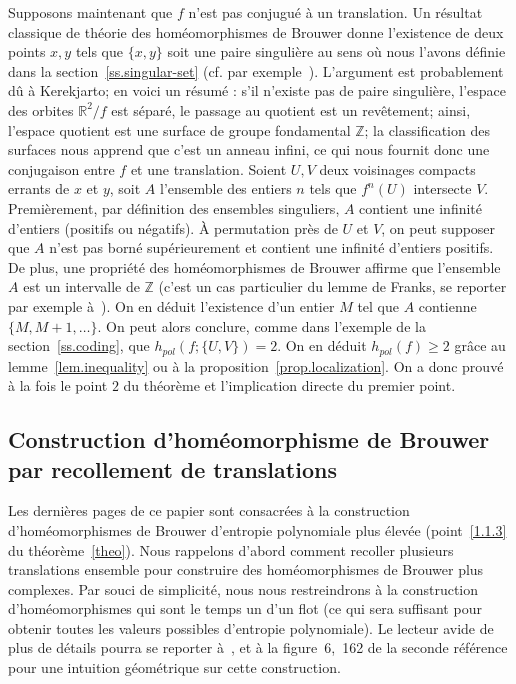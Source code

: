\documentclass[11pt]{article}
\theoremstyle{definition}
\numberwithin{equation}{section}
\numberwithin{figure}{section}
\numberwithin{table}{section}
\newcommand{\bbR}{{\mathbb{R}}}
\newcommand{\bbZ}{{\mathbb{Z}}}
\begin{document}
Supposons maintenant que $f$ n'est pas conjugué à un translation. Un résultat classique de théorie des homéomorphismes de Brouwer donne l'existence de deux points $x,y$ tels que $\{x,y\}$ soit une paire singulière au sens où nous l'avons définie dans la section~\ref{ss.singular-set} (cf. par exemple~\cite{Nak95b}). L'argument est probablement dû à Kerekjarto; en voici un résumé : s'il n'existe pas de paire singulière, l'espace des orbites $\bbR^2/f$ est séparé, le {passage au quotient} est un revêtement; ainsi, l'espace quotient est une surface de groupe fondamental $\bbZ$; la classification des surfaces nous apprend que c'est un anneau infini, ce qui nous fournit donc une conjugaison entre $f$ et une translation. Soient $U,V$ deux voisinages compacts errants de $x$ et $y$, soit $A$ l'ensemble des entiers $n$ tels que $f^n(U)$ intersecte $V$. Premièrement, par définition des ensembles singuliers, $A$ contient une infinité d'entiers (positifs ou négatifs). \`A permutation près de $U$ et $V$, on peut supposer que $A$ n'est pas borné supérieurement et contient une infinité d'entiers positifs. De plus, une propriété des homéomorphismes de Brouwer affirme que l'ensemble $A$ est un intervalle de $\mathbb Z$ (c'est un cas particulier du lemme de Franks, se reporter par exemple à~\cite[Lemma~7]{Ler99}). On en déduit l'existence d'un entier $M$ tel que $A$ contienne $\{M,M+1, \dots \}$. On peut alors conclure, comme dans l'exemple de la section~\ref{ss.coding}, que $h_{pol}(f;\{U,V\}) = 2$. {On en déduit $h_{pol}(f) \geq 2$ grâce au lemme~\ref{lem.inequality} ou à la proposition~\ref{prop.localization}}. On a donc prouvé à la fois le point $2$ du théorème et l'implication directe du premier point.

\subsection{Construction d'homéomorphisme de Brouwer par recollement de translations}\label{ss.recollement}

Les dernières pages de ce papier sont consacrées à la construction d'homéomorphismes de Brouwer d'entropie polynomiale plus élevée (point~\eqref{1.1.3} du théorème~\ref{theo}). {Nous rappelons d'abord comment recoller plusieurs translations ensemble pour construire des homéomorphismes de Brouwer plus complexes.} Par souci de simplicité, nous nous restreindrons à la construction d'homéomorphismes qui sont {le temps un d'un flot} (ce qui sera suffisant pour obtenir toutes les valeurs possibles d'entropie polynomiale). Le lecteur avide de plus de détails pourra se reporter à~\cite{Nak95,BegLer03}, et à la figure~6,~162 de la seconde référence pour une intuition géométrique sur cette construction.
\end{document}

